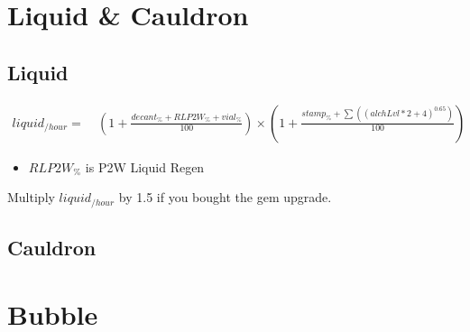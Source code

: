     \section{Liquid \& Cauldron}
        \subsection{Liquid}
            \begin{align*}
                liquid_{/hour} = &\ 
                    \left( 1 + \frac{ decant_\% + RLP2W_\% + vial_\% }{100} \right)
                    \times 
                    \left( 1+ \frac{ stamp_\% + \sum \left( (alchLvl * 2 + 4 )^{0.65} \right) }{100} \right)
            \end{align*}
            \begin{itemize}
                \item $RLP2W_\%$ is P2W Liquid Regen
            \end{itemize}
            Multiply $liquid_{/hour}$ by 1.5 if you bought the gem upgrade.
        

        \subsection{Cauldron}

    \section{Bubble}
